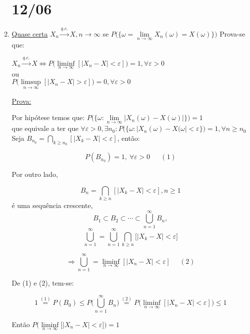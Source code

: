 \documentclass[a4paper,12pt]{article}
\begin{document}
\begin{enumerate}[label =\arabic*)]
\begin{itemize}
\begin{enumerate}
		\end{enumerate}
			\end{itemize}
		\section{12/06}
		\item \underline{Quase certa}
$X_n \overset{q.c.}{\longrightarrow}X, n\rightarrow \infty $ se $P\bigg(
\{ \omega = \lim\limits_{n\rightarrow \infty}  X_n(\omega)= X(\omega)\}
\bigg)$
Prova-se que:

$X_n \overset{q.c.}{\longrightarrow} X \Leftrightarrow P\bigg(
\liminf\limits_{n\rightarrow \infty} [|X_n-X|<\varepsilon]
\bigg) =1, \forall \varepsilon >0 $
\\
ou\\
$P\bigg(
\limsup\limits_{n\rightarrow \infty}[|X_n-X|>\varepsilon]
\bigg)=0, \forall \varepsilon>0 $

\underline{Prova:}

Por hipótese temos que: $P\bigg(
\{\omega : \lim\limits_{n\rightarrow \infty}|X_n(\omega)-X(\omega)| \}
\bigg)=1$\\
que equivale a ter que $\forall \varepsilon>0, \exists n_0: P\bigg(\{
\omega: |X_n(\omega)-X(\omega|<\varepsilon\}
\bigg)=1, \forall n\ge n_0$\\

Seja $B_{n_0} = \bigcap\limits_{k\ge n_0}[|X_k - X|<\varepsilon]$, então:

$$P(B_{n_0})=1, \ \forall \varepsilon>0\ \ \ \ \ \ \ (1) $$

Por outro lado,

$$B_n =\bigcap\limits_{k\ge n}[|X_k - X|<\varepsilon], n\ge 1 $$
é uma sequência crescente, 
$$B_1 \subset B_2\subset \cdots \subset \bigcup\limits_{n=1}^\infty B_n,$$
$$\bigcup\limits_{n=1}^\infty = \bigcup\limits_{n=1}^\infty \bigcap\limits_{k\ge n} \bigg[
|X_k-X|<\varepsilon
\bigg]$$

$$\Rightarrow \bigcup\limits_{n=1}^\infty = \liminf\limits_{n\rightarrow \infty} [|X_n-X|<\varepsilon] \ \ \ \ \ \  (2) $$

De (1) e (2), tem-se:

$$ 1 \overset{(1)}{=} P(B_0) \le P\bigg(
\bigcup\limits_{n=1}^{\infty}B_n
\bigg) 
\overset{(2)}{=}  P\bigg(
\liminf\limits_{n\rightarrow \infty} [|X_n-X|<\varepsilon]
\bigg)\le 1
$$

Então $P\bigg(\liminf\limits_{n\rightarrow \infty} \bigg[|X_n-X|<\varepsilon\bigg]
\bigg)=1$

\newpage 


\end{enumerate}
\end{document}
